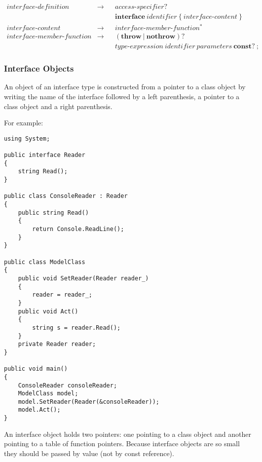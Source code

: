 \documentclass[a4paper,oneside,11pt]{article}
\begin{document}
\begin{align*}
interface\textrm{-}definition &\rightarrow & &\hyperref[accessspecifier]{access\textrm{-}specifier}?\\
& & &\textbf{interface} \> \hyperref[identifier]{identifier} \> \texttt{\{} \> interface\textrm{-}content \> \texttt{\}}\\
interface\textrm{-}content &\rightarrow & &interface\textrm{-}member\textrm{-}function^*\\
interface\textrm{-}member\textrm{-}function &\rightarrow & &(\textbf{throw} \> | \> \textbf{nothrow})?\\
& & &\hyperref[typeexpr]{type\textrm{-}expression} \> \hyperref[identifier]{identifier} \>
\hyperref[parameters]{parameters} \> \textbf{const}? \> \texttt{;}
\end{align*}

\clearpage
\subsubsection{Interface Objects}

An object of an interface type is constructed from a pointer to a class object by writing the name of the interface followed by
a left parenthesis, a pointer to a class object and a right parenthesis.

\begin{flushleft}
For example:
\end{flushleft}

\begin{lstlisting}[frame=trBL]
using System;

public interface Reader
{
    string Read();
}

public class ConsoleReader : Reader
{
    public string Read()
    {
        return Console.ReadLine();
    }
}

public class ModelClass
{
    public void SetReader(Reader reader_)
    {
        reader = reader_;
    }
    public void Act()
    {
        string s = reader.Read();
    }
    private Reader reader;
}

public void main()
{
    ConsoleReader consoleReader;
    ModelClass model;
    model.SetReader(Reader(&consoleReader));
    model.Act();
}
\end{lstlisting}

An interface object holds two pointers: one pointing to a class object and another pointing to a table of function pointers.
Because interface objects are so small they should be passed by value (not by const reference).
\end{document}
